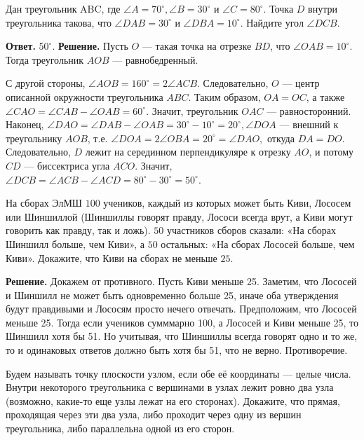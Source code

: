 Дан треугольник ABC, где $\angle A = 70^{\circ}, \angle B = 30^{\circ}$ и $\angle C = 80^{\circ}$. Точка $D$ внутри треугольника такова, что $\angle DAB = 30^{\circ}$ и $\angle DBA = 10^{\circ}.$ Найдите угол $\angle DCB.$

\noindent \textbf{Ответ.} $50^{\circ}$. \textbf{Решение.} Пусть $O$ --- такая точка на отрезке $BD$, что $\angle OAB = 10^{\circ}.$ Тогда треугольник $AOB$ --- равнобедренный.

\newpage

\hspace{3mm}

С другой стороны, $\angle AOB = 160^{\circ} = 2\angle ACB.$ Следовательно, $O$ --- центр описанной окружности треугольника $ABC$. Таким образом, $OA = OC$, а также $\angle CAO = \angle CAB-\angle OAB = 60^{\circ}$. Значит, треугольник $OAC$ --- равносторонний. Наконец, $\angle DAO = \angle DAB-\angle OAB = 30^{\circ}-10^{\circ} = 20^{\circ}, \angle DOA$ --- внешний к треугольнику $AOB$, т.е. $\angle DOA = 2\angle OBA = 20^{\circ} = \angle DAO,$ откуда $DA = DO.$ Следовательно, $D$ лежит на серединном перпендикуляре к отрезку $AO$, и потому $CD$ --- биссектриса угла $ACO$. Значит, $\angle DCB = \angle ACB-\angle ACD = 80^{\circ}-30^{\circ} = 50^{\circ}.$


На сборах ЭлМШ $100$ учеников, каждый из которых может быть Киви, Лососем или Шиншиллой (Шиншиллы говорят правду, Лососи всегда врут, а Киви могут говорить как правду, так и ложь). $50$ участников сборов сказали: «На сборах Шиншилл больше, чем Киви», а $50$ остальных: «На сборах Лососей больше, чем Киви». Докажите, что Киви на сборах не меньше $25.$

\textbf{Решение.} Докажем от противного. Пусть Киви меньше 25. Заметим, что Лососей и Шиншилл не может быть одновременно больше 25, иначе оба утверждения будут правдивыми и Лососям просто нечего отвечать. Предположим, что Лососей меньше 25. Тогда если учеников сумммарно 100, а Лососей и Киви меньше 25, то Шиншилл хотя бы 51. Но учитывая, что Шиншиллы всегда говорят одно и то же, то и одинаковых ответов должно быть хотя бы 51, что не верно. Противоречие.


Будем называть точку плоскости узлом, если обе её координаты --- целые числа. Внутри некоторого треугольника с вершинами в узлах лежит ровно два узла (возможно, какие-то еще узлы лежат на его сторонах). Докажите, что прямая, проходящая через эти два узла, либо проходит через одну из вершин треугольника, либо параллельна одной из его сторон.

